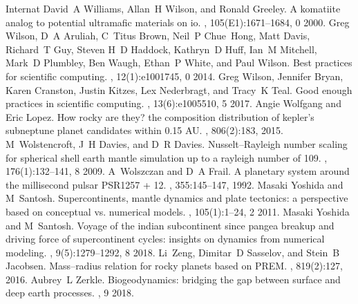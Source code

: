 \documentclass[letterpaper,10pt,english]{jupyterBook}
\begin{document}
\begin{sphinxthebibliography}{Internat}
\sphinxAtStartPar
David A Williams, Allan H Wilson, and Ronald Greeley. A komatiite analog to potential ultramafic materials on io. , 105(E1):1671–1684, 0 2000.
\sphinxAtStartPar
Greg Wilson, D A Aruliah, C Titus Brown, Neil P Chue Hong, Matt Davis, Richard T Guy, Steven H D Haddock, Kathryn D Huff, Ian M Mitchell, Mark D Plumbley, Ben Waugh, Ethan P White, and Paul Wilson. Best practices for scientific computing. , 12(1):e1001745, 0 2014.
\sphinxAtStartPar
Greg Wilson, Jennifer Bryan, Karen Cranston, Justin Kitzes, Lex Nederbragt, and Tracy K Teal. Good enough practices in scientific computing. , 13(6):e1005510, 5 2017.
\sphinxAtStartPar
Angie Wolfgang and Eric Lopez. How rocky are they? the composition distribution of kepler's sub\sphinxhyphen{}neptune planet candidates within 0.15 AU. , 806(2):183, 2015.
\sphinxAtStartPar
M Wolstencroft, J H Davies, and D R Davies. Nusselt–Rayleigh number scaling for spherical shell earth mantle simulation up to a rayleigh number of 109. , 176(1):132–141, 8 2009.
\sphinxAtStartPar
A Wolszczan and D A Frail. A planetary system around the millisecond pulsar PSR1257 + 12. , 355:145–147, 1992.
\sphinxAtStartPar
Masaki Yoshida and M Santosh. Supercontinents, mantle dynamics and plate tectonics: a perspective based on conceptual vs. numerical models. , 105(1):1–24, 2 2011.
\sphinxAtStartPar
Masaki Yoshida and M Santosh. Voyage of the indian subcontinent since pangea breakup and driving force of supercontinent cycles: insights on dynamics from numerical modeling. , 9(5):1279–1292, 8 2018.
\sphinxAtStartPar
Li Zeng, Dimitar D Sasselov, and Stein B Jacobsen. Mass–radius relation for rocky planets based on PREM. , 819(2):127, 2016.
\sphinxAtStartPar
Aubrey L Zerkle. Biogeodynamics: bridging the gap between surface and deep earth processes. , 9 2018.
\sphinxAtStartPar

\end{sphinxthebibliography}
\end{document}
